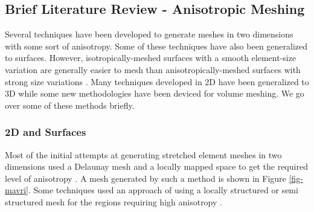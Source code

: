 \subsection{Brief Literature Review - Anisotropic Meshing}

Several techniques have been developed to generate meshes in two dimensions with some sort of anisotropy. Some of these techniques have also been generalized to surfaces. However, isotropically-meshed surfaces with a smooth element-size variation are generally easier to mesh than anisotropically-meshed surfaces with strong size variations \cite{TU2013219}. Many techniques developed in 2D have been generalized to 3D while some new methodologies have been deviced for volume meshing. We go over some of these methods briefly.

\subsubsection{2D and Surfaces}

Most of the initial attempts at generating stretched element meshes in two dimensions used a Delaunay mesh and a locally mapped space to get the required level of anisotropy  \cite{mavriplis1990adaptive}. A mesh generated by such a method is shown in Figure \ref{fig-mavri}. Some techniques used an approach of using a locally structured or semi structured mesh for the regions requiring high anisotropy  \cite{nakahashi1987fdm}.

